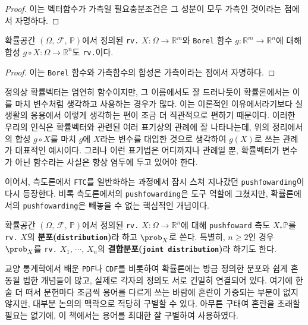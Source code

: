 \begin{proof}
    이는 벡터함수가 가측일 필요충분조건은 그 성분이 모두 가측인 것이라는 점에서 자명하다.
\end{proof}

\begin{theorem}
    확률공간 $(\Omega,\,\mathcal{F},\,\mathbb{P})$에서 정의된 \texttt{rv.} $X:\Omega\to\mathbb{R}^m$와 \texttt{Borel} 함수 $g:\mathbb{R}^m\to\mathbb{R}^n$에 대해 합성 $g\circ X:\Omega\to\mathbb{R}^n$도 \texttt{rv.}이다.
\end{theorem}

\begin{proof}
    이는 \texttt{Borel} 함수와 가측함수의 합성은 가측이라는 점에서 자명하다.
\end{proof}

정의상 확률벡터는 엄연히 함수이지만, 그 이름에서도 잘 드러나듯이 확률론에서는 이를 마치 변수처럼 생각하고 사용하는 경우가 많다. 이는 이론적인 이유에서라기보다 실생활의 응용에서 이렇게 생각하는 편이 조금 더 직관적으로 편하기 때문이다. 이러한 우리의 인식은 확률벡터와 관련된 여러 표기상의 관례에 잘 나타나는데, 위의 정리에서의 합성 $g\circ X$를 마치 $g$에 $X$라는 변수를 대입한 것으로 생각하여 $g(X)$로 쓰는 관례가 대표적인 예시이다. 그러나 이런 표기법은 어디까지나 관례일 뿐, 확률벡터가 변수가 아닌 함수라는 사실은 항상 염두에 두고 있어야 한다.

이어서, 측도론에서 \texttt{FTC}를 일반화하는 과정에서 잠시 스쳐 지나갔던 \texttt{pushfowarding}이 다시 등장한다. 비록 측도론에서의 \texttt{pushfowarding}은 도구 역할에 그쳤지만, 확률론에서의 \texttt{pushfowarding}은 빼놓을 수 없는 핵심적인 개념이다.

\begin{definition}
    확률공간 $(\Omega,\,\mathcal{F},\,\mathbb{P})$에서 정의된 \texttt{rv.} $X:\Omega\to\mathbb{R}^n$에 대해 \texttt{pushfoward} 측도 $X_*\mathbb{P}$를 \texttt{rv.} $X$의 \textbf{분포(\texttt{distribution})}라 하고 $\prob_X$로 쓴다. 특별히, $n\geq2$인 경우 $\prob_X$를 \texttt{rv.} $X_1,\,\cdots,\,X_n$의 \textbf{결합분포(\texttt{joint distribution})}라 하기도 한다.
\end{definition}

교양 통계학에서 배운 \texttt{PDF}나 \texttt{\texttt{CDF}}를 비롯하여 확률론에는 방금 정의한 분포와 쉽게 혼동될 법한 개념들이 많고, 실제로 각자의 정의도 서로 긴밀히 연결되어 있다. 여기에 한술 더 떠서 문헌마다 조금씩 용어를 다르게 쓰는 바람에 혼란이 가중되는 부분이 없지 않지만, 대부분 논의의 맥락으로 적당히 구별할 수 있다. 아무튼 구태여 혼란을 초래할 필요는 없기에, 이 책에서는 용어를 최대한 잘 구별하여 사용하였다.

